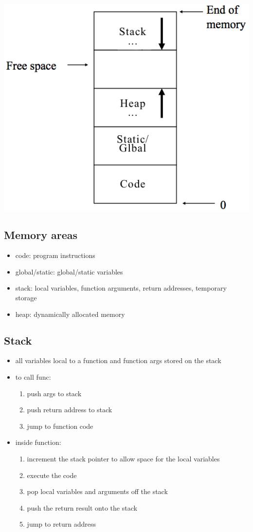\documentclass[10pt, multicolumn, a4paper]{article}
\begin{document}
\begin{multicols}{2}
\includegraphics[scale=.6]{mem_management.png}
	\subsection*{Memory areas}
	\begin{itemize}
	\item code: program instructions
	\item global/static: global/static variables
	\item stack: local variables, function arguments, return addresses, temporary storage
	\item heap: dynamically allocated memory
	\end{itemize}
	\subsection*{Stack}
	\begin{itemize}
	\item all variables local to a function and function args stored on the stack
	\item to call func:
		\begin{enumerate}
		\item push args to stack
		\item push return address to stack
		\item jump to function code
		\end{enumerate}
	\item inside function:
		\begin{enumerate}
		\item increment the stack pointer to allow space for the local variables
		\item execute the code
		\item pop local variables and arguments off the stack 
		\item push the return result onto the stack
		\item jump to return address
		\end{enumerate}
	\end{itemize}

\end{multicols}
\end{document}
